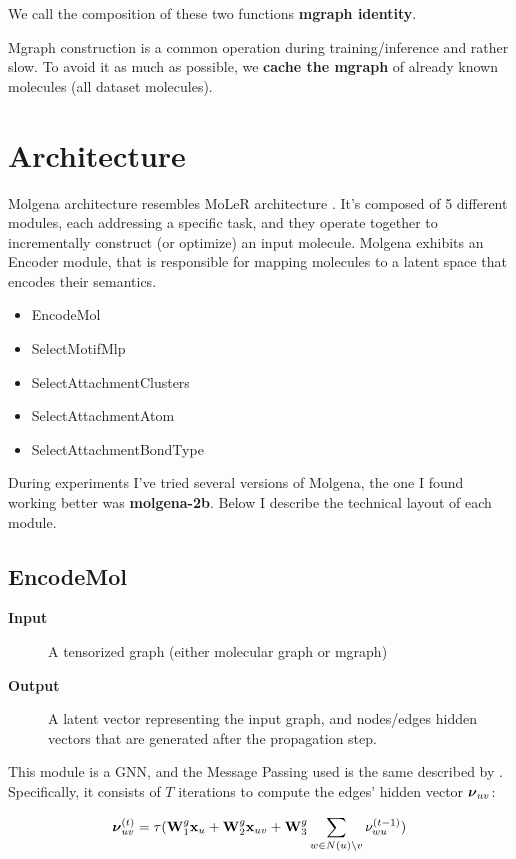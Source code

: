 \documentclass{article}
\begin{document}
We call the composition of these two functions \textbf{mgraph identity}.

Mgraph construction is a common operation during training/inference and rather slow.
To avoid it as much as possible, we \textbf{cache the mgraph} of already known molecules (all dataset molecules).

\section{Architecture}

Molgena architecture resembles MoLeR architecture \cite{microsoft2024}.
It's composed of 5 different modules, each addressing a specific task, and they operate together to incrementally construct (or optimize) an input molecule.
Molgena exhibits an Encoder module, that is responsible for mapping molecules to a latent space that encodes their semantics.

\begin{itemize}
\item EncodeMol
\item SelectMotifMlp
\item SelectAttachmentClusters
\item SelectAttachmentAtom
\item SelectAttachmentBondType
\end{itemize}

During experiments I've tried several versions of Molgena, the one I found working better was \textbf{molgena-2b}.
Below I describe the technical layout of each module.

\subsection{EncodeMol}

\begin{description}
\item[\textbf{Input}]
    A tensorized graph (either molecular graph or mgraph)
\item[\textbf{Output}]
    A latent vector representing the input graph,
    and nodes/edges hidden vectors that are generated after the propagation step.
\end{description}

This module is a GNN, and the Message Passing used is the same described by \cite{jtvae2019}.
Specifically, it consists of $T$ iterations to compute the edges' hidden vector $\boldsymbol\nu_{uv}$:

\begin{equation}
    \boldsymbol\nu_{uv}^{(t)} = \tau(\mathbf{W}_1^g \mathbf{x}_u + \mathbf{W}_2^g \mathbf{x}_{uv} + \mathbf{W}_3^g \sum_{w \in N(u) \backslash v} \nu_{wu}^{(t-1)})
\end{equation}
\end{document}
